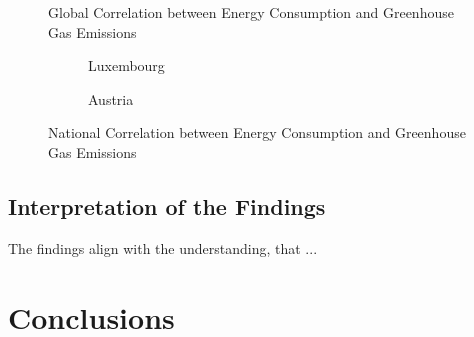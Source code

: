 \documentclass{article}
\begin{document}
\begin{figure}
    \centering
    \resizebox{.7\textwidth}{!}{}
    \caption{Global Correlation between Energy Consumption and Greenhouse Gas Emissions}
    \label{plt:global_consumption_vs_emissions}
\end{figure}

\begin{figure}
    \centering
    \begin{subfigure}[b]{0.49\textwidth}
        \centering
        \resizebox{\textwidth}{!}{}
        \caption{Luxembourg}
        \label{plt:LU_consumption_vs_emissions}
    \end{subfigure}
    \hfill
    \begin{subfigure}[b]{0.49\textwidth}
        \centering
        \resizebox{\textwidth}{!}{}
        \caption{Austria}
        \label{plt:AT_consumption_vs_emissions}
    \end{subfigure}
    \caption{National Correlation between Energy Consumption and Greenhouse Gas Emissions}
\end{figure}

\subsection*{Interpretation of the Findings}
The findings align with the understanding, that ...

\section*{Conclusions}
\end{document}
